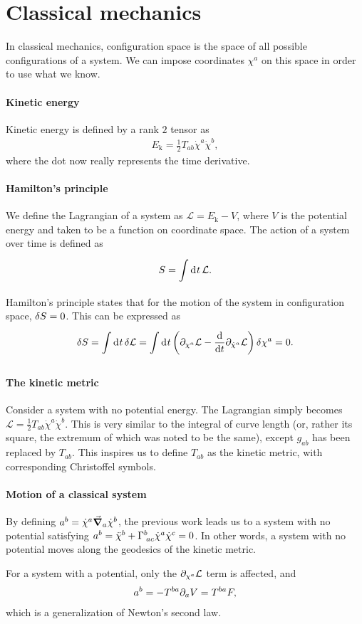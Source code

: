 \section{Classical mechanics}
In classical mechanics, configuration space is the space of all possible configurations of a system. We can impose coordinates $\chi^{a}$ on this space in order to use what we know.

\paragraph{Kinetic energy}
Kinetic energy is defined by a rank $2$ tensor as
\begin{align*}
	E_{\text{k}} = \frac{1}{2}T_{ab}\dot{\chi}^{a}\dot{\chi}^{b},
\end{align*}
where the dot now really represents the time derivative.

\paragraph{Hamilton's principle}
We define the Lagrangian of a system as $\mathcal{L} = E_{\text{k}} - V$, where $V$ is the potential energy and taken to be a function on coordinate space. The action of a system over time is defined as
\begin{align*}
	S = \int\limits_{}^{}\dd[]{t}\mathcal{L}.
\end{align*}
Hamilton's principle states that for the motion of the system in configuration space, $\delta S = 0$. This can be expressed as
\begin{align*}
	\delta S = \int\limits_{}^{}\dd[]{t}\delta \mathcal{L} = \int\limits_{}^{}\dd[]{t}\left(\partial_{\chi^{a}}\mathcal{L} - \dv{t}\partial_{\dot{\chi}^{a}}\mathcal{L}\right)\delta \chi^{a} = 0.
\end{align*}

\paragraph{The kinetic metric}
Consider a system with no potential energy. The Lagrangian simply becomes $\mathcal{L} = \frac{1}{2}T_{ab}\dot{\chi}^{a}\dot{\chi}^{b}$. This is very similar to the integral of curve length (or, rather its square, the extremum of which was noted to be the same), except $g_{ab}$ has been replaced by $T_{ab}$. This inspires us to define $T_{ab}$ as the kinetic metric, with corresponding Christoffel symbols.

\paragraph{Motion of a classical system}
By defining $a^{b} = \dot{\chi}^{a}\grad_{a}{\dot{\chi}^{b}}$, the previous work leads us to a system with no potential satisfying $a^{b} = \ddot{\chi}^{b} + \Gamma^{b}_{\;ac}\dot{\chi}^{a}\dot{\chi}^{c} = 0$. In other words, a system with no potential moves along the geodesics of the kinetic metric.

For a system with a potential, only the $\partial_{\chi^{a}}\mathcal{L}$ term is affected, and
\begin{align*}
	a^{b} = - T^{ba}\partial_{a}V = T^{ba}F,
\end{align*}
which is a generalization of Newton's second law.